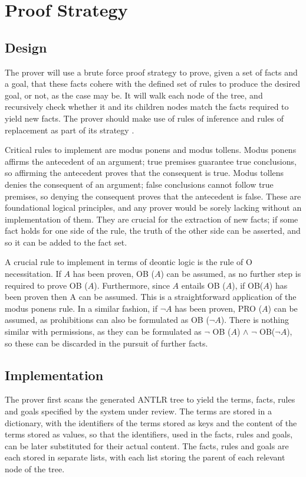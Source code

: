 \documentclass{l4proj}
\begin{document}
\section{Proof Strategy}

\subsection{Design}
The prover will use a brute force proof strategy to prove, given a set of facts and a goal, that these facts cohere with the defined set of rules to produce the desired goal, or not, as the case may be. It will walk each node of the tree, and recursively check whether it and its children nodes match the facts required to yield new facts. The prover should make use of rules of inference and rules of replacement as part of its strategy \cite{infrules}. 

Critical rules to implement are modus ponens and modus tollens. Modus ponens affirms the antecedent of an argument; true premises guarantee true conclusions, so affirming the antecedent proves that the consequent is true. Modus tollens denies the consequent of an argument; false conclusions cannot follow true premises, so denying the consequent proves that the antecedent is false. These are foundational logical principles, and any prover would be sorely lacking without an implementation of them. They are crucial for the extraction of new facts; if some fact holds for one side of the rule, the truth of the other side can be asserted, and so it can be added to the fact set. 

A crucial rule to implement in terms of deontic logic is the rule of O necessitation. If $A$ has been proven, OB ($A$) can be assumed, as no further step is required to prove OB ($A$). Furthermore, since $A$ entails OB ($A$), if OB($A$) has been proven then A can be assumed. This is a straightforward application of the modus ponens rule. In a similar fashion, if $\neg A$ has been proven, PRO ($A$) can be assumed, as prohibitions can also be formulated as OB ($\neg A$). There is nothing similar with permissions, as they can be formulated as $\neg$ OB ($A$) $\land$ $\neg$ OB($\neg A$), so these can be discarded in the pursuit of further facts. 

\subsection{Implementation}
The prover first scans the generated ANTLR tree to yield the terms, facts, rules and goals specified by the system under review. The terms are stored in a dictionary, with the identifiers of the terms stored as keys and the content of the terms stored as values, so that the identifiers, used in the facts, rules and goals, can be later substituted for their actual content. The facts, rules and goals are each stored in separate lists, with each list storing the parent of each relevant node of the tree. 
\end{document}
